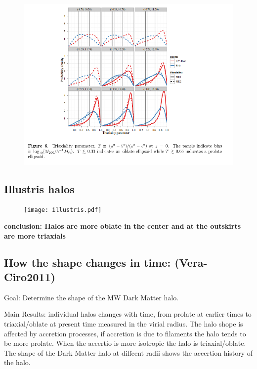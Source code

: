 \documentclass[16pt]{article}
\begin{document}
\begin{figure}[H]
\centering
\includegraphics[scale=0.5]{triaxial.png}
\end{figure}


\subsection{Illustris halos}

\begin{figure}[H]
\texttt{[image: illustris.pdf]}
\end{figure}

\textbf{conclusion: Halos are more oblate in the center and at the outskirts are more triaxials}


\subsection{How the shape changes in time: (Vera-Ciro2011)}

Goal:  Determine the shape of the MW Dark Matter halo.

Main Results: individual halos changes with time, from prolate at earlier times 
to triaxial/oblate at present time measured in the virial radius. The halo 
shope is affected by accretion processes, if accretion is due to filaments
the halo tends to be more prolate. When the accertio is more isotropic the halo
is triaxial/oblate. The shape of the Dark Matter halo at diffeent radii shows 
the accertion history of the halo.    
\end{document}
